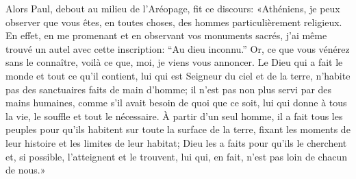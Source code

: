 Alors Paul, debout au milieu de l’Aréopage, fit ce discours:
	«Athéniens, je peux observer que vous êtes, en toutes choses,
	des hommes particulièrement religieux.
En effet, en me promenant et en observant vos monuments sacrés,
	j’ai même trouvé un autel avec cette inscription:
	“Au dieu inconnu.”
Or, ce que vous vénérez sans le connaître, voilà ce que, moi, je viens vous annoncer.
Le Dieu qui a fait le monde et tout ce qu’il contient,
	lui qui est Seigneur du ciel et de la terre,
	n’habite pas des sanctuaires faits de main d’homme;
	il n’est pas non plus servi par des mains humaines,
	comme s’il avait besoin de quoi que ce soit,
	lui qui donne à tous la vie, le souffle et tout le nécessaire.
À partir d’un seul homme, il a fait tous les peuples
	pour qu’ils habitent sur toute la surface de la terre,
	fixant les moments de leur histoire et les limites de leur habitat;
	Dieu les a faits pour qu’ils le cherchent
	et, si possible, l’atteignent et le trouvent,
	lui qui, en fait, n’est pas loin de chacun de nous.»

